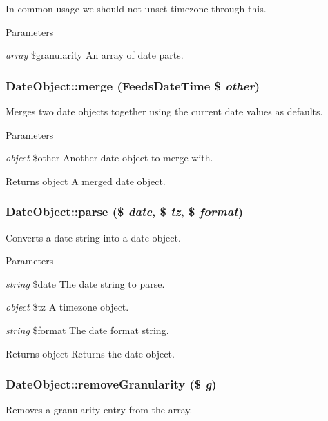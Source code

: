 In common usage we should not unset timezone through this.


\begin{DoxyParams}{Parameters}
\item[{\em array}]\$granularity An array of date parts. \end{DoxyParams}
\hypertarget{classDateObject_a9974bc28e7a0bc4e8fece41fa065bb53}{
\subsubsection[{merge}]{\setlength{\rightskip}{0pt plus 5cm}DateObject::merge (FeedsDateTime \$ {\em other})}}
\label{classDateObject_a9974bc28e7a0bc4e8fece41fa065bb53}
Merges two date objects together using the current date values as defaults.


\begin{DoxyParams}{Parameters}
\item[{\em object}]\$other Another date object to merge with.\end{DoxyParams}
\begin{DoxyReturn}{Returns}
object A merged date object. 
\end{DoxyReturn}
\hypertarget{classDateObject_a46f98ee14391ce5aff22406b65858949}{
\subsubsection[{parse}]{\setlength{\rightskip}{0pt plus 5cm}DateObject::parse (\$ {\em date}, \/  \$ {\em tz}, \/  \$ {\em format})}}
\label{classDateObject_a46f98ee14391ce5aff22406b65858949}
Converts a date string into a date object.


\begin{DoxyParams}{Parameters}
\item[{\em string}]\$date The date string to parse. \item[{\em object}]\$tz A timezone object. \item[{\em string}]\$format The date format string.\end{DoxyParams}
\begin{DoxyReturn}{Returns}
object Returns the date object. 
\end{DoxyReturn}
\hypertarget{classDateObject_a46c9b0df6160a5253f90adbac4e1848f}{
\subsubsection[{removeGranularity}]{\setlength{\rightskip}{0pt plus 5cm}DateObject::removeGranularity (\$ {\em g})}}
\label{classDateObject_a46c9b0df6160a5253f90adbac4e1848f}
Removes a granularity entry from the array.


